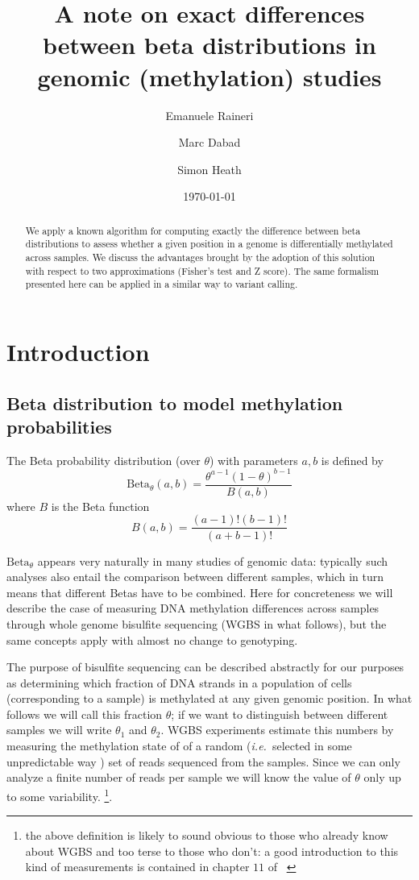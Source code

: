 \documentclass[11pt]{amsart}
\title{A note on exact differences between beta distributions in genomic (methylation) studies}
\author{Emanuele Raineri}
\author{Marc Dabad}
\author{Simon Heath}
\date{\today}
\newcommand{\ie}{\textit{i.e.}\ }
\newcommand{\betapdf}{\mbox{Beta}_\theta}
\begin{document}
\begin{abstract}
We apply a known algorithm for computing exactly the difference between beta distributions
to assess whether a given position in a genome is differentially methylated across
samples. We discuss the advantages brought by the adoption of this solution
with respect to two approximations (Fisher's test and Z score).
The same formalism presented here can be applied in a similar way to variant calling.
\end{abstract}
\maketitle
\section{Introduction}
\subsection{Beta distribution to model methylation probabilities}
The Beta probability distribution (over $\theta$) with parameters $a,b$ is defined by 
\[\betapdf(a,b)=\frac{\theta^{a-1}(1-\theta)^{b-1}}{B(a,b)}\]
where  $B$ is the Beta function 
\[B(a,b)=\frac{(a-1)!(b-1)!}{(a+b-1)!}\]

$\betapdf$ appears very naturally in many studies of genomic data: typically such analyses also entail the comparison between different samples, which in turn means that different Betas have to be combined. Here for concreteness we will describe the case of measuring DNA methylation differences across samples through whole genome bisulfite sequencing (WGBS in what follows), but the same concepts  apply with almost no change to genotyping. 

The purpose of bisulfite sequencing  can be described abstractly for our purposes as determining which fraction of DNA strands in a population of cells (corresponding to a sample) is methylated at any given genomic position. In what follows we will call this fraction $\theta$; if we want to distinguish between different samples we will write $\theta_1$ and $\theta_2$. WGBS experiments estimate this numbers by measuring the methylation state of of a random (\ie selected in some unpredictable way ) set of reads sequenced from the samples. Since we can only analyze a finite number of reads per sample we will know the value of $\theta$ only up to some variability. 
\footnote{the above definition is likely to sound obvious to those who already know about WGBS and too terse to those who don't: a good introduction to this kind of measurements is contained in chapter $11$ of ~\cite{dna}}.
\end{document}
